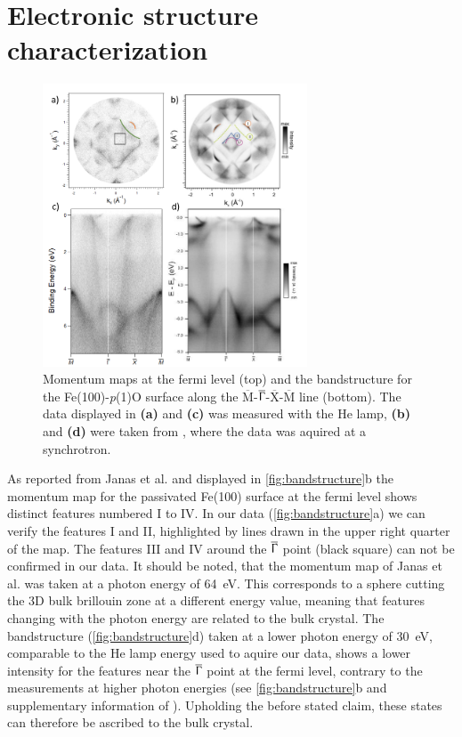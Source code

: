 \newpage
\section{Electronic structure characterization}
\begin{figure}[h]
    \centering
    \includegraphics[width = 0.7\textwidth]{Plots/bandstructure.png}
    \caption{Momentum maps at the fermi level (top) and the bandstructure for the Fe(100)-\textit{p}(1)O surface along the $\overline{\text{M}}$-$\overline{\Upgamma}$-$\overline{\text{X}}$-$\overline{\text{M}}$ line (bottom). The data displayed in \textbf{(a)} and \textbf{(c)} was measured with the He lamp, \textbf{(b)} and \textbf{(d)} were taken from \cite*{janas_enhancing_2022}, where the data was aquired at a synchrotron.}
    \label{fig:bandstructure}
\end{figure}
\FloatBarrier
As reported from Janas et al. \cite*{janas_enhancing_2022} and displayed in \autoref{fig:bandstructure}b the momentum map for the passivated Fe(100) surface at the fermi level shows distinct features numbered I to IV.
In our data (\autoref{fig:bandstructure}a) we can verify the features I and II, highlighted by lines drawn in the upper right quarter of the map.
The features III and IV around the $\overline{\Upgamma}$ point (black square) can not be confirmed in our data.
It should be noted, that the momentum map of Janas et al. \cite*{janas_enhancing_2022} was taken at a photon energy of \qty{64}{eV}.
This corresponds to a sphere cutting the 3D bulk brillouin zone at a different energy value, meaning that features changing 
with the photon energy are related to the bulk crystal.
The bandstructure (\autoref{fig:bandstructure}d) taken at a lower photon energy of \qty{30}{eV}, comparable to the He lamp energy used to aquire our data, shows a lower intensity for the features near the $\overline{\Upgamma}$ point at the fermi level,
contrary to the measurements at higher photon energies (see \autoref{fig:bandstructure}b and supplementary information of \cite*{janas_enhancing_2022}). 
Upholding the before stated claim, these states can therefore be ascribed to the bulk crystal.


